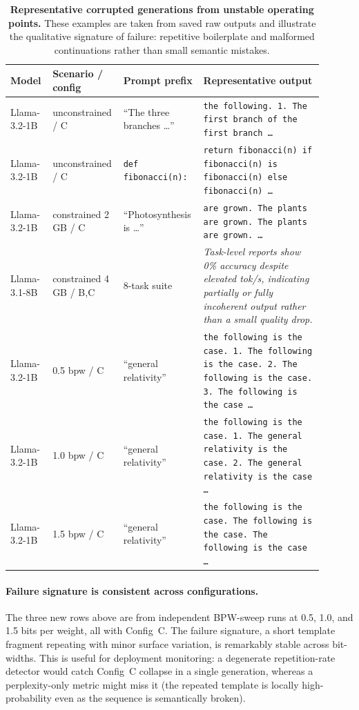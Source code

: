 \documentclass{article}
\begin{document}
\begin{table}[H]
\centering
\caption{\textbf{Representative corrupted generations from unstable operating points.}
These examples are taken from saved raw outputs and illustrate the qualitative signature of
failure: repetitive boilerplate and malformed continuations rather than small semantic
mistakes.}
\label{tab:failure_examples}
\footnotesize
\setlength{\tabcolsep}{4pt}
\begin{tabular}{p{0.13\linewidth}p{0.17\linewidth}p{0.23\linewidth}p{0.37\linewidth}}
\toprule
Model & Scenario / config & Prompt prefix & Representative output \\
\midrule
Llama-3.2-1B & unconstrained / C & ``The three branches \ldots'' &
\texttt{the following. 1. The first branch of the first branch \ldots} \\
Llama-3.2-1B & unconstrained / C & \texttt{def fibonacci(n):} &
\texttt{return fibonacci(n) if fibonacci(n) is fibonacci(n) else fibonacci(n) \ldots} \\
Llama-3.2-1B & constrained 2\,GB / C & ``Photosynthesis is \ldots'' &
\texttt{are grown. The plants are grown. The plants are grown. \ldots} \\
Llama-3.1-8B & constrained 4\,GB / B,C & 8-task suite &
\textit{Task-level reports show 0\% accuracy despite elevated tok/s, indicating partially or fully incoherent output rather than a small quality drop.} \\
Llama-3.2-1B & 0.5 bpw / C & ``general relativity'' &
\texttt{the following is the case. 1. The following is the case. 2. The following is the case. 3. The following is the case \ldots} \\
Llama-3.2-1B & 1.0 bpw / C & ``general relativity'' &
\texttt{the following is the case. 1. The general relativity is the case. 2. The general relativity is the case \ldots} \\
Llama-3.2-1B & 1.5 bpw / C & ``general relativity'' &
\texttt{the following is the case. The following is the case. The following is the case \ldots} \\
\bottomrule
\end{tabular}
\end{table}

\paragraph{Failure signature is consistent across configurations.} The three new rows
above are from independent BPW-sweep runs at 0.5, 1.0, and 1.5 bits per weight, all
with Config~C. The failure signature, a short
template fragment repeating with minor surface variation, is remarkably stable across
bit-widths. This is useful for deployment monitoring: a degenerate repetition-rate
detector would catch Config~C collapse in a single generation, whereas a perplexity-only
metric might miss it (the repeated template is locally high-probability even as the
sequence is semantically broken).
\end{document}
